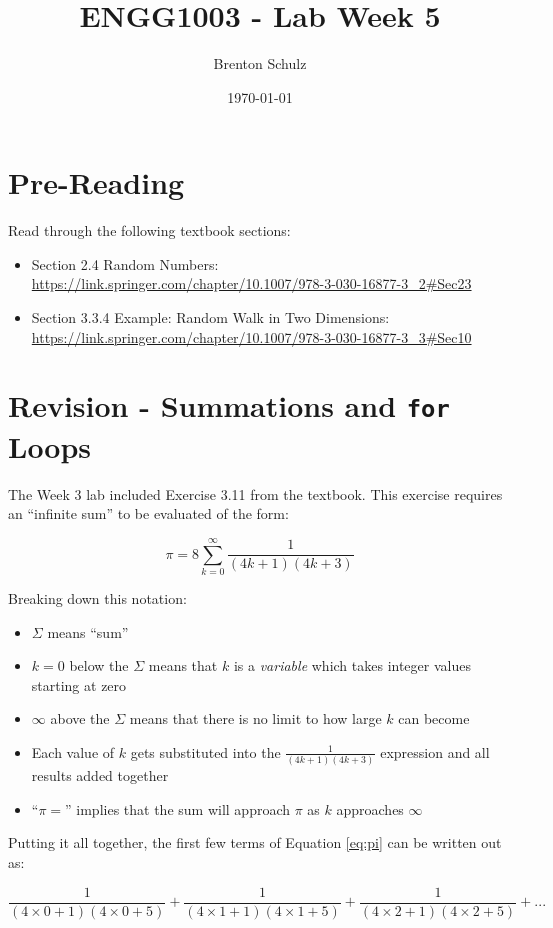 \documentclass{lab}
\title{ENGG1003 - Lab Week 5}
\author{Brenton Schulz}
\date{\today}
\begin{document}
\maketitle

\section{Pre-Reading}
Read through the following textbook sections:

\begin{itemize}
\item Section 2.4 Random Numbers: \url{https://link.springer.com/chapter/10.1007/978-3-030-16877-3_2#Sec23}
\item Section 3.3.4 Example: Random Walk in Two Dimensions: \url{https://link.springer.com/chapter/10.1007/978-3-030-16877-3_3#Sec10}
\end{itemize}

\pagebreak

\section{Revision - Summations and \texttt{for} Loops}

The Week 3 lab included Exercise 3.11 from the textbook. This exercise requires an ``infinite sum'' to be evaluated of the form:

\begin{equation}\label{eq:pi}
\pi = 8 \sum_{k=0}^{\infty}\frac{1}{(4k+1)(4k+3)}
\end{equation}

Breaking down this notation:
\begin{itemize}
\item $\Sigma$ means ``sum''
\item $k=0$ below the $\Sigma$ means that $k$ is a \textit{variable} which takes integer values starting at zero
\item $\infty$ above the $\Sigma$ means that there is no limit to how large $k$ can become
\item Each value of $k$ gets substituted into the $\frac{1}{(4k+1)(4k+3)}$ expression and all results added together
\item ``$\pi=$'' implies that the sum will approach $\pi$ as $k$ approaches $\infty$
\end{itemize}

Putting it all together, the first few terms of Equation \ref{eq:pi} can be written out as:

\begin{equation}
\frac{1}{(4\times 0 + 1)(4 \times 0 + 5)} + \frac{1}{(4\times 1 + 1)(4 \times 1 + 5)} + \frac{1}{(4\times 2 + 1)(4 \times 2 + 5)} + ...
\end{equation}
\end{document}
